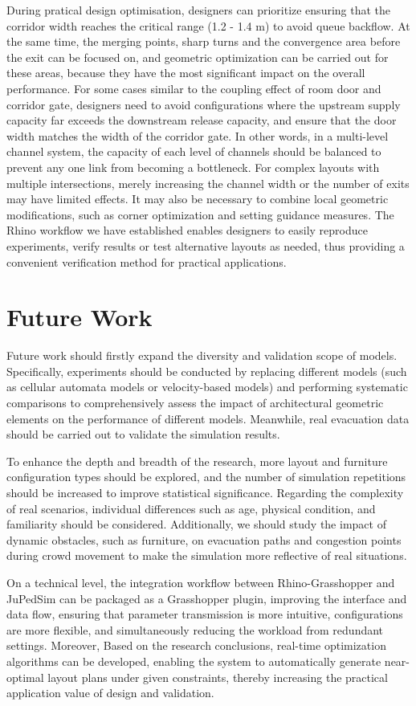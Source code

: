 During pratical design optimisation, designers can prioritize ensuring that the corridor width reaches the critical range (1.2 - 1.4 m) to avoid queue backflow. At the same time, the merging points, sharp turns and the convergence area before the exit can be focused on, and geometric optimization can be carried out for these areas, because they have the most significant impact on the overall performance. For some cases similar to the coupling effect of room door and corridor gate, designers need to avoid configurations where the upstream supply capacity far exceeds the downstream release capacity, and ensure that the door width matches the width of the corridor gate. In other words, in a multi-level channel system, the capacity of each level of channels should be balanced to prevent any one link from becoming a bottleneck. For complex layouts with multiple intersections, merely increasing the channel width or the number of exits may have limited effects. It may also be necessary to combine local geometric modifications, such as corner optimization and setting guidance measures. The Rhino workflow we have established enables designers to easily reproduce experiments, verify results or test alternative layouts as needed, thus providing a convenient verification method for practical applications.

\section{Future Work}
Future work should firstly expand the diversity and validation scope of models. Specifically, experiments should be conducted by replacing different models (such as cellular automata models or velocity-based models) and performing systematic comparisons to comprehensively assess the impact of architectural geometric elements on the performance of different models. Meanwhile, real evacuation data should be carried out to validate the simulation results.

To enhance the depth and breadth of the research, more layout and furniture configuration types should be explored, and the number of simulation repetitions should be increased to improve statistical significance. Regarding the complexity of real scenarios, individual differences such as age, physical condition, and familiarity should be considered.  Additionally, we should study the impact of dynamic obstacles, such as furniture, on evacuation paths and congestion points during crowd movement to make the simulation more reflective of real situations.

On a technical level, the integration workflow between Rhino-Grasshopper and JuPedSim can be  packaged as a Grasshopper plugin, improving the interface and data flow, ensuring that parameter transmission is more intuitive, configurations are more flexible, and simultaneously reducing the workload from redundant settings. Moreover, Based on the research conclusions, real-time optimization algorithms can be developed, enabling the system to automatically generate near-optimal layout plans under given constraints, thereby increasing the practical application value of design and validation.